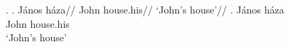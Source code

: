 \documentclass[12pt,letterpaper]{article}
\begin{document}
\ex.
\a.
	\begingl
    \gla{}J\'anos h\'aza//
    \glb John house.his//
    \glft `John's house'//
    \endgl
\bg. János háza\\
     John house.his\\
     \glt `John's house'
\end{document}

